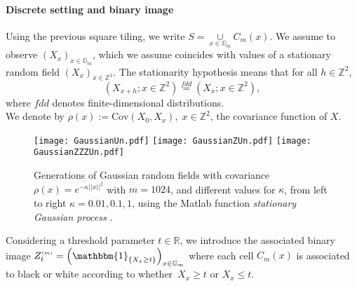 \documentclass[12pt]{article}
\theoremstyle{Theorem}
\theoremstyle{definition}
\begin{document}
\vspace{-1cm}
\paragraph{Discrete setting and binary image}
Using the previous square tiling, we write $S =  \underset{x \in \mathbb{G}_{m}}{\cup}  C_{m}(x)$. We assume to observe $\left(X_{\scriptscriptstyle x}\right)_{x \in \mathbb{G}_{m}}$, which we assume coincides with values of a stationary random field $\left(X_{\scriptscriptstyle x}\right)_{x \in \mathbb{Z}^{2}}$. The stationarity hypothesis means that for all $h \in \mathbb{Z}^{2}$, 
$$\left(X_{x+h}; x \in \mathbb{Z}^{2} \right)\overset{fdd}{=} \left(X_{\scriptscriptstyle x}; x \in \mathbb{Z}^{2} \right),$$ where $fdd$ denotes finite-dimensional distributions. \\
We denote by $\rho(x) :=\text{Cov}\left(X_{\scriptscriptstyle 0}, X_{\scriptscriptstyle x}\right), \; x \in \mathbb{Z}^{2}$, the covariance function of $X$.
\vspace{-1.5cm}
\begin{figure}[H]
    {\texttt{[image: GaussianUn.pdf]}}
    {\texttt{[image: GaussianZUn.pdf]}}
    {\texttt{[image: GaussianZZZUn.pdf]}}
    \vspace{-2cm}
 \caption{Generations of Gaussian random fields with covariance $\rho(x) = e^{-\kappa||x||^{2}}$ with $m = 1024$, and different values for $\kappa$, from left to right $\kappa = 0.01, 0.1, 1$, using the Matlab function \textit{stationary Gaussian process} \cite{MATLAB}.}
\label{fig22}
\end{figure}
Considering a threshold parameter $t \in \mathbb{R}$, we introduce the associated binary \linebreak image $Z^{\scriptscriptstyle (m)}_{t} = \left(\mathbbm{1}_{\left\{X_x \geq t\right\}} \right)_{x \in \mathbb{G}_{m}}$ where each cell $C_{m}(x)$ is associated to black or white according to whether~$X_{x} \geq t$ or $X_{x} \leq t$. 
\end{document}
